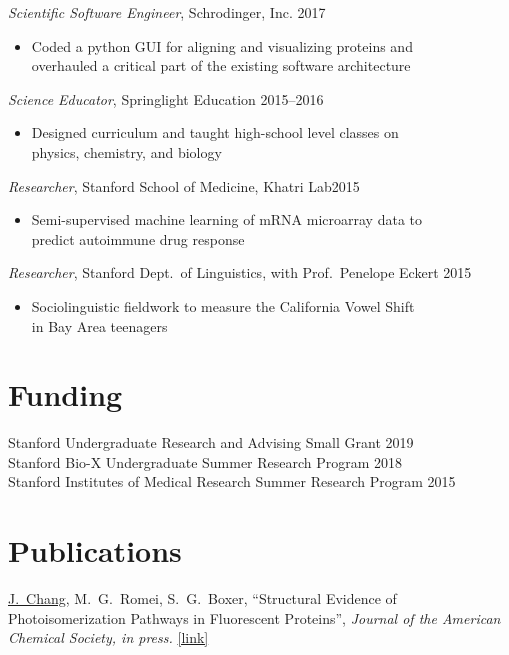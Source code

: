 \documentclass[margin, 10pt]{res}
\newenvironment{myitemize}
{ \vspace{-1.5\topsep} \begin{itemize} }
{ \end{itemize} \vspace{-1.0\topsep}}
\begin{document}
\begin{resume}
\textit{Scientific Software Engineer}, Schrodinger, Inc. \hfill 2017 \\
\begin{myitemize}
    \item Coded a python GUI for aligning and visualizing proteins and \\overhauled a critical part of the existing software architecture
\end{myitemize}

\textit{Science Educator}, Springlight Education \hfill 2015--2016\\
\begin{myitemize}
    \item Designed curriculum and taught high-school level classes on \\
        physics, chemistry, and biology
\end{myitemize}

\textit{Researcher}, Stanford School of Medicine, Khatri Lab\hfill 2015\\
\begin{myitemize}
    \item Semi-supervised machine learning of mRNA microarray data to \\predict autoimmune drug response
\end{myitemize}

\textit{Researcher}, Stanford Dept.\ of Linguistics, with Prof.\ Penelope Eckert \hfill 2015\\
\begin{myitemize}
    \item Sociolinguistic fieldwork to measure the California Vowel Shift \\in Bay Area teenagers
\end{myitemize}

\section{Funding}

Stanford Undergraduate Research and Advising Small Grant \hfill 2019 \\
Stanford Bio-X Undergraduate Summer Research Program \hfill 2018 \\
Stanford Institutes of Medical Research Summer Research Program \hfill 2015

\section{Publications}
    \underline{J.\ Chang}, M.\ G.\ Romei, S.\ G.\ Boxer, ``Structural Evidence of Photoisomerization Pathways in Fluorescent Proteins'',  \textit{Journal of the American Chemical Society, in press.} \href{http://dx.doi.org/10.1021/jacs.9b08356}{[link]}


\end{resume}
\end{document}
